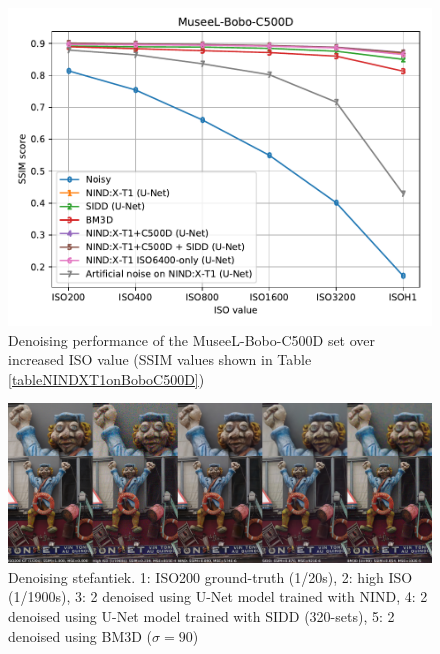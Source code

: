 \documentclass[10pt,twocolumn,letterpaper]{article}
\makeatletter
\newcommand\footnoteref[1]{\protected@xdef\@thefnmark{\ref{#1}}\@footnotemark}
\makeatother
\begin{document}
\begin{figure}[!htbp]
\centering
\includegraphics[width=1\linewidth]{boboc500d.pdf}
%
\caption{Denoising performance of the MuseeL-Bobo-C500D set over increased ISO value (SSIM values shown in Table \ref{tableNINDXT1onBoboC500D})}
\label{fig:boboc500d}
\vspace{-0.2cm} 
\end{figure}

\begin{figure}[!htbp]
\centering
\includegraphics[width=1\linewidth]{stefantiek.jpg}
\caption[caption for stefantiek]{Denoising stefantiek. 1: ISO200 ground-truth (1/20s), 2: high ISO (1/1900s), 3: 2 denoised using U-Net model trained with NIND, 4: 2 denoised using U-Net model trained with SIDD (320-sets), 5: 2 denoised using BM3D ($\sigma=90$\footnoteref{sigmanote})}
\label{fig:stefantiek}
\vspace{-0.2cm} 
\end{figure}

\end{document}
